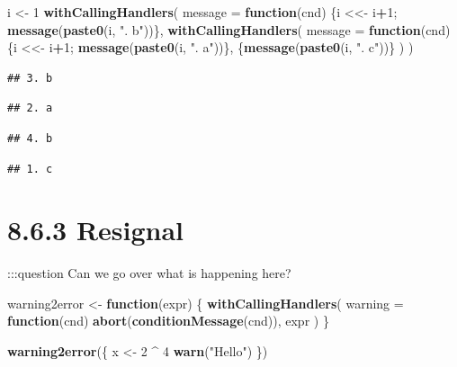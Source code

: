 \documentclass[]{book}
\newenvironment{Shaded}{\begin{snugshade}}{\end{snugshade}}
\newcommand{\ControlFlowTok}[1]{\textcolor[rgb]{0.13,0.29,0.53}{\textbf{#1}}}
\newcommand{\DataTypeTok}[1]{\textcolor[rgb]{0.13,0.29,0.53}{#1}}
\newcommand{\DecValTok}[1]{\textcolor[rgb]{0.00,0.00,0.81}{#1}}
\newcommand{\KeywordTok}[1]{\textcolor[rgb]{0.13,0.29,0.53}{\textbf{#1}}}
\newcommand{\NormalTok}[1]{#1}
\newcommand{\OperatorTok}[1]{\textcolor[rgb]{0.81,0.36,0.00}{\textbf{#1}}}
\newcommand{\StringTok}[1]{\textcolor[rgb]{0.31,0.60,0.02}{#1}}
\begin{document}
\begin{Shaded}
\begin{Highlighting}[]
\NormalTok{i <-}\StringTok{ }\DecValTok{1}
\KeywordTok{withCallingHandlers}\NormalTok{(}
  \DataTypeTok{message =} \ControlFlowTok{function}\NormalTok{(cnd) \{i <<-}\StringTok{ }\NormalTok{i}\OperatorTok{+}\DecValTok{1}\NormalTok{; }\KeywordTok{message}\NormalTok{(}\KeywordTok{paste0}\NormalTok{(i, }\StringTok{". b"}\NormalTok{))\},}
  \KeywordTok{withCallingHandlers}\NormalTok{(}
    \DataTypeTok{message =} \ControlFlowTok{function}\NormalTok{(cnd) \{i <<-}\StringTok{ }\NormalTok{i}\OperatorTok{+}\DecValTok{1}\NormalTok{; }\KeywordTok{message}\NormalTok{(}\KeywordTok{paste0}\NormalTok{(i, }\StringTok{". a"}\NormalTok{))\},}
\NormalTok{    \{}\KeywordTok{message}\NormalTok{(}\KeywordTok{paste0}\NormalTok{(i, }\StringTok{". c"}\NormalTok{))\}}
\NormalTok{  )}
\NormalTok{)}
\end{Highlighting}
\end{Shaded}

\begin{verbatim}
## 3. b
\end{verbatim}

\begin{verbatim}
## 2. a
\end{verbatim}

\begin{verbatim}
## 4. b
\end{verbatim}

\begin{verbatim}
## 1. c
\end{verbatim}

\hypertarget{resignal}{%
\section*{8.6.3 Resignal}\label{resignal}}

:::question
Can we go over what is happening here?

\begin{Shaded}
\begin{Highlighting}[]
\NormalTok{warning2error <-}\StringTok{ }\ControlFlowTok{function}\NormalTok{(expr) \{}
  \KeywordTok{withCallingHandlers}\NormalTok{(}
    \DataTypeTok{warning =} \ControlFlowTok{function}\NormalTok{(cnd) }\KeywordTok{abort}\NormalTok{(}\KeywordTok{conditionMessage}\NormalTok{(cnd)),}
\NormalTok{    expr}
\NormalTok{  )}
\NormalTok{\}}

\KeywordTok{warning2error}\NormalTok{(\{}
\NormalTok{  x <-}\StringTok{ }\DecValTok{2} \OperatorTok{^}\StringTok{ }\DecValTok{4}
  \KeywordTok{warn}\NormalTok{(}\StringTok{"Hello"}\NormalTok{)}
\NormalTok{\})}
\end{Highlighting}
\end{Shaded}
\end{document}
